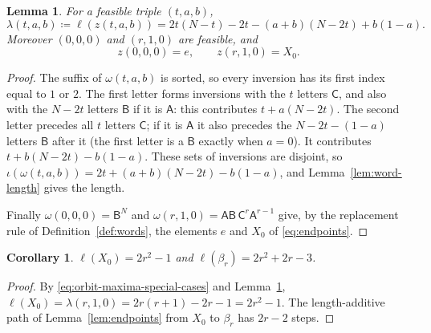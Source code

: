 \documentclass[11pt,a4paper,reqno]{amsart}
\numberwithin{equation}{section}
\newtheorem{lemma}[theorem]{Lemma}
\newtheorem{corollary}[theorem]{Corollary}
\theoremstyle{definition}
\theoremstyle{remark}
\theoremstyle{plain}
\newcommand{\A}{\mathsf A}
\newcommand{\B}{\mathsf B}
\newcommand{\CC}{\mathsf C}
\begin{document}
\begin{lemma}\label{lem:orbit-maximal-lengths}
For a feasible triple $(t,a,b)$,
\[
 \lambda(t,a,b)\coloneqq\ell(z(t,a,b))=2t(N-t)-2t-(a+b)(N-2t)+b(1-a).
\]
Moreover $(0,0,0)$ and $(r,1,0)$ are feasible, and
\begin{equation}\label{eq:orbit-maxima-special-cases}
 z(0,0,0)=e,\qquad z(r,1,0)=X_0.
\end{equation}
\end{lemma}
\begin{proof}
The suffix of $\omega(t,a,b)$ is sorted, so every inversion has its first index equal to $1$ or $2$.
The first letter forms inversions with the $t$ letters $\CC$, and also with the $N-2t$ letters $\B$ if it is $\A$:
this contributes $t+a(N-2t)$. The second letter precedes all $t$ letters $\CC$; if it is $\A$ it also precedes the
$N-2t-(1-a)$ letters $\B$ after it (the first letter is a $\B$ exactly when $a=0$). It contributes
$t+b(N-2t)-b(1-a)$. These sets of inversions are disjoint, so
$\iota(\omega(t,a,b))=2t+(a+b)(N-2t)-b(1-a)$, and Lemma~\ref{lem:word-length} gives the length.

Finally $\omega(0,0,0)=\B^N$ and $\omega(r,1,0)=\A\B\,\CC^r\A^{r-1}$ give, by the replacement rule of
Definition~\ref{def:words}, the elements $e$ and $X_0$ of \eqref{eq:endpoints}.
\end{proof}

\begin{corollary}\label{lem:endpoint-lengths}
$\ell(X_0)=2r^2-1$ and $\ell(\beta_r)=2r^2+2r-3$.
\end{corollary}
\begin{proof}
By \eqref{eq:orbit-maxima-special-cases} and Lemma~\ref{lem:orbit-maximal-lengths},
$\ell(X_0)=\lambda(r,1,0)=2r(r+1)-2r-1=2r^2-1$. The length-additive path of Lemma~\ref{lem:endpoints}
from $X_0$ to $\beta_r$ has $2r-2$ steps.
\end{proof}
\end{document}
